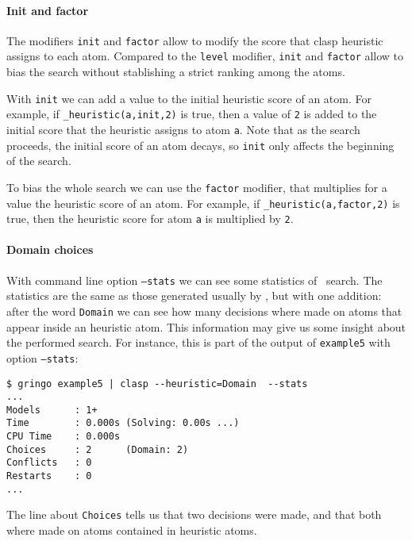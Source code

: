 \paragraph{Init and factor}

The modifiers \texttt{init} and \texttt{factor} allow to modify the score that clasp heuristic assigns to each atom.
Compared to the \texttt{level} modifier, \texttt{init} and \texttt{factor} allow to bias the search without stablishing a strict ranking among the atoms.

With \texttt{init} we can add a value to the initial heuristic score of an atom.
For example, if \texttt{\_heuristic(a,init,2)} is true, then a value of \texttt{2} is added to
the initial score that the heuristic assigns to atom \texttt{a}.
Note that as the search proceeds, the initial score of an atom decays, so \texttt{init} only affects the beginning of the search.

To bias the whole search we can use the \texttt{factor} modifier,
that multiplies for a value the heuristic score of an atom.
For example, if \texttt{\_heuristic(a,factor,2)} is true, then the heuristic score for atom \texttt{a}  is multiplied by \texttt{2}.

\paragraph{Domain choices}

With command line option \texttt{--stats} we can see some statistics of \clasp\ search.
The statistics are the same as those generated usually by \clasp, but with one addition:
after the word \texttt{Domain} we can see how many decisions where made on atoms that appear  inside an heuristic atom.
This information may give us some insight about the performed search.
For instance, this is part of the output of \texttt{example5} with option \texttt{--stats}:
\begin{lstlisting}[numbers=none]
$ gringo example5 | clasp --heuristic=Domain  --stats
...
Models      : 1+
Time        : 0.000s (Solving: 0.00s ...)
CPU Time    : 0.000s
Choices     : 2      (Domain: 2)
Conflicts   : 0
Restarts    : 0
...
\end{lstlisting}

 The line about \texttt{Choices} tells us that  two decisions were made, and that both where made on atoms contained in heuristic atoms.


